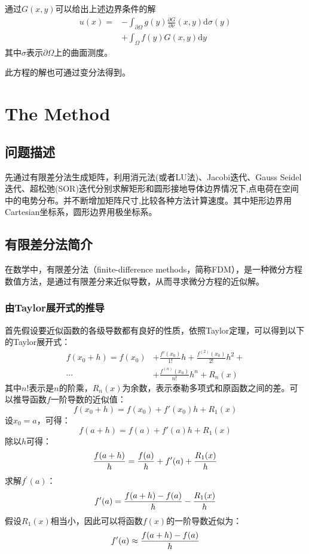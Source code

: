 \documentclass[twoside,twocolumn]{article}
\begin{document}
\begin{CJK*}{UTF8}{gkai}
	通过$G(x,y)$可以给出上述边界条件的解
	\begin{equation*}
	\begin{aligned}
		u(x)=&-\int _{{\partial \Omega }}g(y){\frac {\partial G}{\partial \nu }}(x,y){\mathrm {d}}\sigma (y)\\
		&+\int _{\Omega }f(y)G(x,y){\mathrm {d}}y
	\end{aligned}
	\end{equation*}
	其中$\sigma$表示$\partial\Omega$上的曲面测度。
	
	此方程的解也可通过变分法得到。
\section{The Method}
	\subsection{问题描述}
	先通过有限差分法生成矩阵，利用消元法(或者LU法)、Jacobi迭代、Gauss Seidel迭代、超松弛(SOR)迭代分别求解矩形和圆形接地导体边界情况下,点电荷在空间中的电势分布。并不断增加矩阵尺寸,比较各种方法计算速度。其中矩形边界用Cartesian坐标系，圆形边界用极坐标系。
	\subsection{有限差分法简介}
	在数学中，有限差分法（finite-difference methods，简称FDM），是一种微分方程数值方法，是通过有限差分来近似导数，从而寻求微分方程的近似解。
	\subsubsection{由Taylor展开式的推导}
	首先假设要近似函数的各级导数都有良好的性质，依照Taylor定理，可以得到以下的Taylor展开式：
	\begin{equation*}
	\begin{aligned}
	f(x_{0}+h)=f(x_{0})&+{\frac {f'(x_{0})}{1!}}h+{\frac {f^{(2)}(x_{0})}{2!}}h^{2}+\\\cdots& +{\frac {f^{(n)}(x_{0})}{n!}}h^{n}+R_{n}(x)
	\end{aligned}
	\end{equation*}
	其中$n!$表示是$n$的阶乘，$R_{n}(x)$为余数，表示泰勒多项式和原函数之间的差。可以推导函数$f$一阶导数的近似值：
	\begin{equation*}
	f(x_{0}+h)=f(x_{0})+f'(x_{0})h+R_{1}(x)
	\end{equation*}
	设$x_{0}=a$，可得：
	\begin{equation*}
	f(a+h)=f(a)+f'(a)h+R_{1}(x)
	\end{equation*}
	除以$h$可得：
	\begin{equation*}
	{f(a+h) \over h}={f(a) \over h}+f'(a)+{R_{1}(x) \over h}
	\end{equation*}
	求解$f^{\prime}(a)$：
	\begin{equation*}
	f^{\prime}(a)={f(a+h)-f(a) \over h}-{R_{1}(x) \over h}
	\end{equation*}
	假设$R_{1}(x)$相当小，因此可以将函数$f(x)$的一阶导数近似为：
	\begin{equation*}
	f'(a)\approx {f(a+h)-f(a) \over h}
	\end{equation*} 

\end{CJK*}
\end{document}
